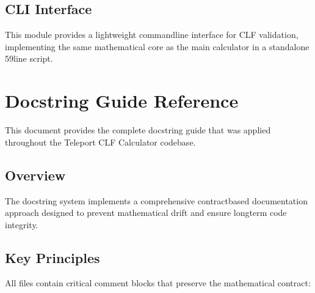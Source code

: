 \documentclass[letterpaper,10pt,english]{sphinxmanual}
\begin{document}
\subsection{CLI Interface}
\label{\detokenize{clf_maximal_validator:cli-interface}}
\sphinxAtStartPar
This module provides a lightweight command\sphinxhyphen{}line interface for CLF validation, implementing the same mathematical core as the main calculator in a standalone 59\sphinxhyphen{}line script.

\sphinxstepscope


\section{Docstring Guide Reference}
\label{\detokenize{docstring_guide:docstring-guide-reference}}\label{\detokenize{docstring_guide::doc}}
\sphinxAtStartPar
This document provides the complete docstring guide that was applied throughout the Teleport CLF Calculator codebase.


\subsection{Overview}
\label{\detokenize{docstring_guide:overview}}
\sphinxAtStartPar
The docstring system implements a comprehensive contract\sphinxhyphen{}based documentation approach designed to prevent mathematical drift and ensure long\sphinxhyphen{}term code integrity.


\subsection{Key Principles}
\label{\detokenize{docstring_guide:key-principles}}
\sphinxAtStartPar
{}

\sphinxAtStartPar
All files contain critical  comment blocks that preserve the mathematical contract:

\begin{sphinxVerbatim}[commandchars=\\\{\}]

\end{sphinxVerbatim}
\end{document}

